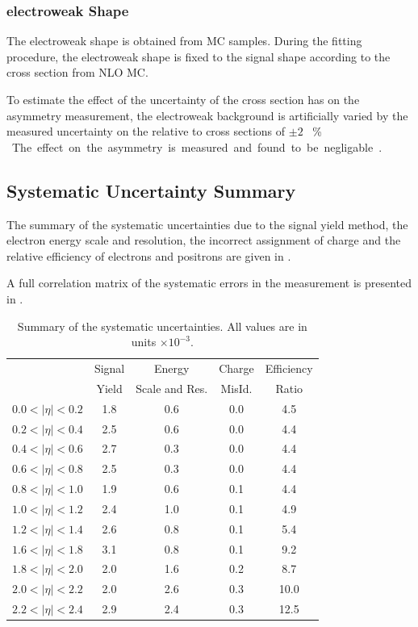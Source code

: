 \subsubsection{electroweak \ETm Shape}

The {electroweak} shape is obtained from {MC} samples. During the fitting
procedure, the {electroweak} shape is fixed to the \Wenu signal shape according to
the cross section from NLO {MC}.

To estimate the effect of the uncertainty of the cross section has on the
asymmetry measurement, the {electroweak} background is artificially varied by
the measured uncertainty on the relative \PW to \PZ cross sections of
\unit{$\pm2$}{ \% }. The effect on the asymmetry is measured and found to be
negligable \cite{bendavid2011electron}.

\subsection{Systematic Uncertainty Summary}
The summary of the systematic uncertainties due to the signal yield method, the
electron energy scale and resolution, the incorrect assignment of charge and the
relative efficiency of electrons and positrons are given in
.

A full correlation matrix of the systematic errors in the measurement is
presented in .

\begin{table}[htbp]
 \begin{center}
   \begin{tabular}{lcccc}
\midrule
      &Signal & Energy & Charge &  Efficiency \\
     & Yield & Scale and Res. & MisId. & Ratio \\ \midrule
$0.0<|\eta|<0.2$ & 1.8 & 0.6 & 0.0 &  4.5 \\
$0.2<|\eta|<0.4$ & 2.5 & 0.6 & 0.0 &  4.4 \\
$0.4<|\eta|<0.6$ & 2.7 & 0.3 & 0.0 &  4.4 \\
$0.6<|\eta|<0.8$ & 2.5 & 0.3 & 0.0 &  4.4 \\
$0.8<|\eta|<1.0$ & 1.9 & 0.6 & 0.1 &  4.4 \\
$1.0<|\eta|<1.2$ & 2.4 & 1.0 & 0.1 &  4.9 \\
$1.2<|\eta|<1.4$ & 2.6 & 0.8 & 0.1 &  5.4 \\
$1.6<|\eta|<1.8$ & 3.1 & 0.8 & 0.1 &  9.2 \\
$1.8<|\eta|<2.0$ & 2.0 & 1.6 & 0.2 &  8.7 \\
$2.0<|\eta|<2.2$ & 2.0 & 2.6 & 0.3 & 10.0 \\
$2.2<|\eta|<2.4$ & 2.9 & 2.4 & 0.3 & 12.5 \\
\bottomrule
    \end{tabular}
  \end{center}
 \caption{\label{tab:updatedsummarysyst}Summary of the systematic uncertainties.
All values are in units $\times 10^{-3}$\cite{bendavid2011electron}. }
\end{table}
                  

